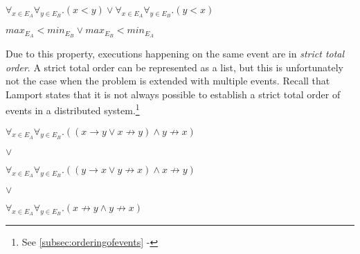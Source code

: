 	\begin{center}
		$\forall_{x \in E_A}\forall_{y \in E_B} . (x < y) \lor \forall_{x \in E_A}\forall_{y \in E_B} . (y < x)$ 
	\end{center}

	\begin{center}
		$max_{E_A} < min_{E_B} \lor max_{E_B} < min_{E_A}$
	\end{center}
    
	\newpar Due to this property, executions happening on the same event are in  \textit{strict total order}. A strict total order can be represented as a list, but this is unfortunately not the case when the problem is extended with multiple events. Recall that Lamport states that it is not always possible to establish a strict total order of events in a distributed system.\footnote{See \autoref{subsec:orderingofevents} - } 
	
    \begin{center}
		$\forall_{x \in E_A}\forall_{y \in E_B} . ((x \rightarrow y \lor x \not\rightarrow y) \land y \not\rightarrow x)$
        
        $\lor$
        
        $\forall_{x \in E_A}\forall_{y \in E_B} . ((y \rightarrow x \lor y \not\rightarrow x) \land x \not\rightarrow y)$
        
        $\lor$
        
        $\forall_{x \in E_A}\forall_{y \in E_B} . (x \not\rightarrow y \land y \not\rightarrow x)$
	\end{center}
    
